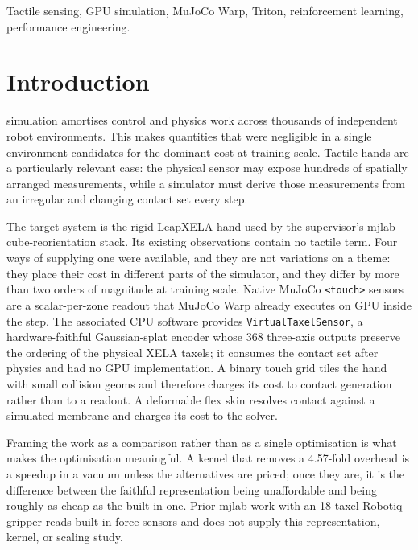 \documentclass[journal]{IEEEtran}
\begin{document}
\begin{IEEEkeywords}
Tactile sensing, GPU simulation, MuJoCo Warp, Triton, reinforcement learning, performance engineering.
\end{IEEEkeywords}

\IEEEpeerreviewmaketitle

\section{Introduction}

 simulation amortises control and physics work across thousands of independent robot environments. This makes quantities that were negligible in a single environment candidates for the dominant cost at training scale. Tactile hands are a particularly relevant case: the physical sensor may expose hundreds of spatially arranged measurements, while a simulator must derive those measurements from an irregular and changing contact set every step.

The target system is the rigid LeapXELA hand used by the supervisor's mjlab cube-reorientation stack. Its existing observations contain no tactile term. Four ways of supplying one were available, and they are not variations on a theme: they place their cost in different parts of the simulator, and they differ by more than two orders of magnitude at training scale. Native MuJoCo \texttt{\textless touch\textgreater} sensors are a scalar-per-zone readout that MuJoCo Warp already executes on GPU inside the step. The associated CPU software provides \texttt{VirtualTaxelSensor}, a hardware-faithful Gaussian-splat encoder whose 368 three-axis outputs preserve the ordering of the physical XELA taxels; it consumes the contact set after physics and had no GPU implementation. A binary touch grid tiles the hand with small collision geoms and therefore charges its cost to contact generation rather than to a readout. A deformable flex skin resolves contact against a simulated membrane and charges its cost to the solver.

Framing the work as a comparison rather than as a single optimisation is what makes the optimisation meaningful. A kernel that removes a 4.57-fold overhead is a speedup in a vacuum unless the alternatives are priced; once they are, it is the difference between the faithful representation being unaffordable and being roughly as cheap as the built-in one. Prior mjlab work with an 18-taxel Robotiq gripper reads built-in force sensors and does not supply this representation, kernel, or scaling study.
\end{document}
